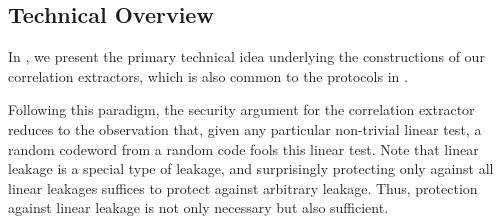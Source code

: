 \subsection{Technical Overview}
In , we present the primary technical idea underlying the constructions of our correlation extractors,  which is also common to the protocols in \cite{ISIT:IMSW14,C:GIMS15}.




Following this paradigm, the security argument for the correlation extractor reduces to the observation that, given any particular non-trivial linear test, a random codeword from a random code fools this linear test. 
Note that linear leakage is a special type of leakage, and surprisingly protecting only against all linear leakages suffices to protect against arbitrary leakage. 
Thus, protection against linear leakage is not only necessary but also sufficient. 

